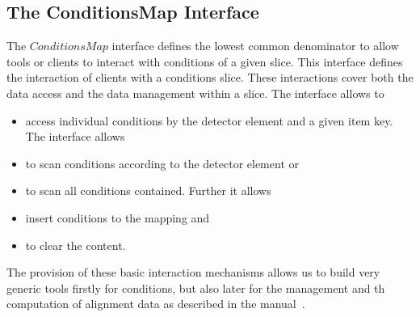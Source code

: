 \documentclass[10pt,a4paper]{article}
\begin{document}
\subsection{The ConditionsMap Interface}
\label{subsec:ddcond-conditionsmap}

\noindent
The $ConditionsMap$ interface defines the lowest common denominator to
allow tools or clients to interact with conditions of a given slice.
This interface defines the interaction of clients with a conditions slice.
These interactions cover both the data access and the data management 
within a slice. The interface allows to
\begin{itemize}
\item access individual conditions by the detector element
and a given item key. The interface allows
\item to scan conditions according to the detector element or 
\item to scan all conditions contained. Further it allows 
\item insert conditions to the mapping and
\item to clear the content.
\end{itemize}
The provision of these basic interaction mechanisms allows us to build
very generic tools firstly for conditions, but also later for the
management and th computation of alignment data as described in
the \DDA manual~\cite{bib:ddalign-manual}.
\end{document}
